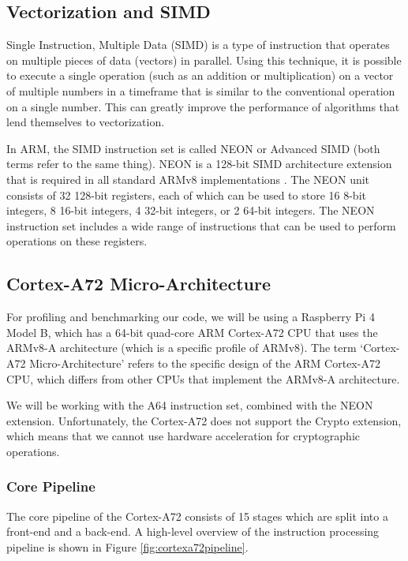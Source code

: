 \documentclass[11pt,a4paper]{report}
\theoremstyle{definition}
\begin{document}
\subsection{Vectorization and SIMD}
\label{sec:simd}
Single Instruction, Multiple Data (SIMD) is a type of instruction that operates on multiple pieces of data (vectors) in parallel. Using this technique, it is possible to execute a single operation (such as an addition or multiplication) on a vector of multiple numbers in a timeframe that is similar to the conventional operation on a single number. This can greatly improve the performance of algorithms that lend themselves to vectorization.

In ARM, the SIMD instruction set is called NEON or Advanced SIMD (both terms refer to the same thing). NEON is a 128-bit SIMD architecture extension that is required in all standard ARMv8 implementations \cite{ARMv8A-ProgrammersGuide}. The NEON unit consists of 32 128-bit registers, each of which can be used to store 16 8-bit integers, 8 16-bit integers, 4 32-bit integers, or 2 64-bit integers. The NEON instruction set includes a wide range of instructions that can be used to perform operations on these registers.


\subsection{Cortex-A72 Micro-Architecture}
For profiling and benchmarking our code, we will be using a Raspberry Pi 4 Model B, which has a 64-bit quad-core ARM Cortex-A72 CPU that uses the ARMv8-A architecture (which is a specific profile of ARMv8). The term `Cortex-A72 Micro-Architecture' refers to the specific design of the ARM Cortex-A72 CPU, which differs from other CPUs that implement the ARMv8-A architecture.

We will be working with the A64 instruction set, combined with the NEON extension. Unfortunately, the Cortex-A72 does not support the Crypto extension, which means that we cannot use hardware acceleration for cryptographic operations.

\subsubsection{Core Pipeline}
The core pipeline of the Cortex-A72 consists of 15 stages which are split into a front-end and a back-end. A high-level overview of the instruction processing pipeline \cite{CortexA72OptGuide} is shown in Figure \ref{fig:cortexa72pipeline}.
\end{document}

